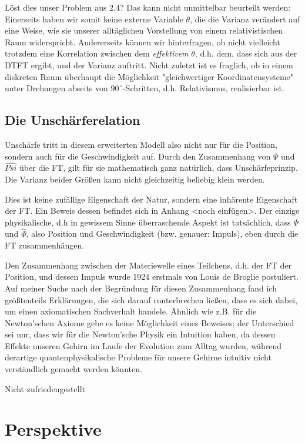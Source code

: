 \documentclass[a4paper,12pt,ngerman]{scrartcl}
\theoremstyle{plain}
\theoremstyle{plain}
\theoremstyle{plain}
\theoremstyle{plain}
\begin{document}
Löst dies unser Problem aus 2.4? Das kann nicht unmittelbar beurteilt werden: Einerseits haben wir somit keine externe Variable $\theta$, die die Varianz verändert auf eine Weise, wie sie unserer alltäglichen Vorstellung von einem relativistischen Raum widerspricht. Andererseits können wir hinterfragen, ob nicht vielleicht trotzdem eine Korrelation zwischen dem \textit{effektivem} $\theta$, d.h. dem, dass sich aus der DTFT ergibt, und der Varianz auftritt. Nicht zuletzt ist es fraglich, ob in einem diskreten Raum überhaupt die Möglichkeit "gleichwertiger Koordinatensysteme" unter Drehungen abseits von $90^{\,\circ}$-Schritten, d.h. Relativismus, realisierbar ist. 

\subsection{Die Unschärferelation}

Unschärfe tritt in diesem erweiterten Modell also nicht nur für die Position, sondern auch für die Geschwindigkeit auf. Durch den Zusammenhang von $\Psi$ und $\widehat{Psi}$ über die FT, gilt für sie mathematisch ganz natürlich, dass Unschärfeprinzip. Die Varianz beider Größen kann nicht gleichzeitig beliebig klein werden. 

Dies ist keine zufällige Eigenschaft der Natur, sondern eine inhärente Eigenschaft der FT. Ein Beweis dessen befindet sich in Anhang <noch einfügen>. Der einzige physikalische, d.h in gewissem Sinne überraschende Aspekt ist tatsächlich, dass $\Psi$ und $\widehat{\Psi}$, also Position und Geschwindigkeit (bzw. genauer: Impuls), eben durch die FT zusammenhängen.

Den Zusammenhang zwischen der Materiewelle eines Teilchens, d.h. der FT der Position, und dessen Impuls wurde 1924 erstmals von Louis de Broglie postuliert. Auf meiner Suche nach der Begründung für diesen Zusammenhang fand ich größtenteils Erklärungen, die sich darauf runterbrechen ließen, dass es sich dabei, um einen axiomatischen Sachverhalt handele. Ähnlich wie z.B. für die Newton'schen Axiome gebe es keine Möglichkeit eines Beweises; der Unterschied sei nur, dass wir für die Newton'sche Physik ein Intuition haben, da dessen Effekte unseren Gehirn im Laufe der Evolution zum Alltag wurden, während derartige quantenphysikalische Probleme für unsere Gehirne intuitiv nicht verständlich gemacht werden könnten.

Nicht zufriedengestellt 

\section{Perspektive}
\end{document}
